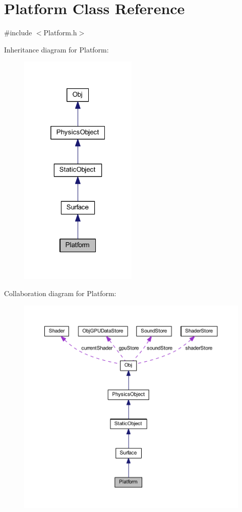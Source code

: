 \hypertarget{class_platform}{}\section{Platform Class Reference}
\label{class_platform}


{\ttfamily \#include $<$Platform.\+h$>$}



Inheritance diagram for Platform\+:
\nopagebreak
\begin{figure}[H]
\begin{center}
\leavevmode
\includegraphics[width=160pt]{class_platform__inherit__graph}
\end{center}
\end{figure}


Collaboration diagram for Platform\+:
\nopagebreak
\begin{figure}[H]
\begin{center}
\leavevmode
\includegraphics[width=350pt]{class_platform__coll__graph}
\end{center}
\end{figure}
